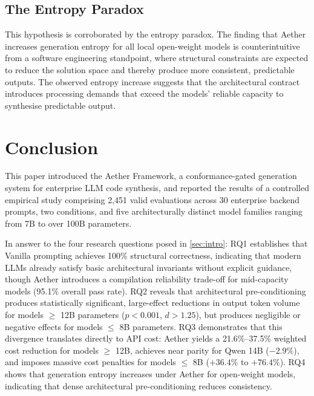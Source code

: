 \documentclass[review,12pt,3p]{elsarticle}
\begin{document}
\subsection{The Entropy Paradox}

This hypothesis is corroborated by the entropy paradox. The finding that Aether increases generation
entropy for all local open-weight models is counterintuitive from a software engineering standpoint,
where structural constraints are expected to reduce the solution space and thereby produce more consistent,
predictable outputs. The observed entropy increase suggests that the architectural contract introduces
processing demands that exceed the models' reliable capacity to synthesise predictable output.

\section{Conclusion}
\label{sec:conclusion}

This paper introduced the Aether Framework, a conformance-gated generation system for
enterprise LLM code synthesis, and reported the results of a controlled empirical study
comprising 2,451 valid evaluations across 30 enterprise backend prompts, two conditions, and
five architecturally distinct model families ranging from 7B to over 100B parameters.

In answer to the four research questions posed in \cref{sec:intro}: RQ1 establishes that
Vanilla prompting achieves 100\% structural correctness, indicating that modern LLMs already
satisfy basic architectural invariants without explicit guidance, though Aether introduces a compilation reliability trade-off for mid-capacity models (95.1\% overall pass rate). RQ2 reveals that
architectural pre-conditioning produces statistically significant, large-effect reductions
in output token volume for models $\ge$ 12B parameters ($p < 0.001$, $d > 1.25$), but produces
negligible or negative effects for models $\le$ 8B parameters. RQ3 demonstrates that this
divergence translates directly to API cost: Aether yields a 21.6\%--37.5\% weighted cost
reduction for models $\ge$ 12B, achieves near parity for Qwen 14B ($-2.9\%$), and imposes
massive cost penalties for models $\le$ 8B ($+36.4\%$ to $+76.4\%$). RQ4 shows that generation
entropy increases under Aether for open-weight models, indicating that dense architectural
pre-conditioning reduces consistency.
\end{document}
